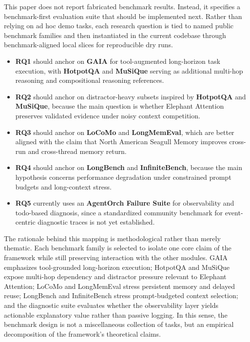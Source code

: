 \documentclass[a4paper,fleqn]{cas-sc}
\begin{document}
This paper does not report fabricated benchmark results. Instead, it specifies a benchmark-first evaluation suite that should be implemented next. Rather than relying on ad hoc demo tasks, each research question is tied to named public benchmark families and then instantiated in the current codebase through benchmark-aligned local slices for reproducible dry runs.
\begin{itemize}
\item \textbf{RQ1} should anchor on \textbf{GAIA} for tool-augmented long-horizon task execution, with \textbf{HotpotQA} and \textbf{MuSiQue} serving as additional multi-hop reasoning and compositional reasoning references.
\item \textbf{RQ2} should anchor on distractor-heavy subsets inspired by \textbf{HotpotQA} and \textbf{MuSiQue}, because the main question is whether Elephant Attention preserves validated evidence under noisy context competition.
\item \textbf{RQ3} should anchor on \textbf{LoCoMo} and \textbf{LongMemEval}, which are better aligned with the claim that North American Seagull Memory improves cross-run and cross-thread memory return.
\item \textbf{RQ4} should anchor on \textbf{LongBench} and \textbf{InfiniteBench}, because the main hypothesis concerns performance degradation under constrained prompt budgets and long-context stress.
\item \textbf{RQ5} currently uses an \textbf{AgentOrch Failure Suite} for observability and todo-based diagnosis, since a standardized community benchmark for event-centric diagnostic traces is not yet established.
\end{itemize}

The rationale behind this mapping is methodological rather than merely thematic. Each benchmark family is selected to isolate one core claim of the framework while still preserving interaction with the other modules. GAIA emphasizes tool-grounded long-horizon execution; HotpotQA and MuSiQue expose multi-hop dependency and distractor pressure relevant to Elephant Attention; LoCoMo and LongMemEval stress persistent memory and delayed reuse; LongBench and InfiniteBench stress prompt-budgeted context selection; and the diagnostic suite evaluates whether the observability layer yields actionable explanatory value rather than passive logging. In this sense, the benchmark design is not a miscellaneous collection of tasks, but an empirical decomposition of the framework's theoretical claims.
\end{document}
